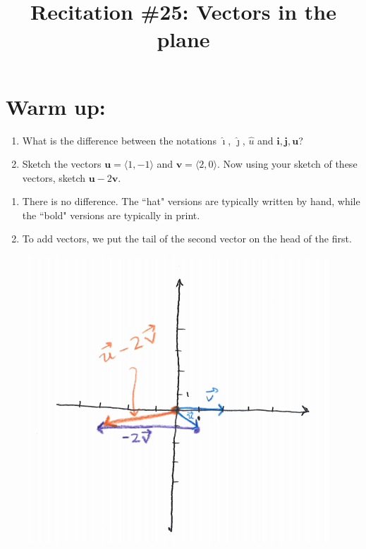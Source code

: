 \documentclass[handout]{ximera}
\title{Recitation \#25: Vectors in the plane}
\begin{document}
\begin{abstract}		\end{abstract}
\maketitle




\section{Warm up:}
\begin{enumerate}
\item What is the difference between the notations $\hat{\imath}$, $\hat{\jmath}$, $\hat{u}$ and $\mathbf{i}, \mathbf{j}, \mathbf{u}$?
\item Sketch the vectors $\mathbf{u}=\langle 1, -1 \rangle$ and $\mathbf{v}=\langle 2, 0 \rangle$. Now using your sketch of these vectors, sketch $\mathbf{u}-2\mathbf{v}$.
\end{enumerate}
	\begin{freeResponse}
	\begin{enumerate}
	\item There is no difference. The ``hat" versions are typically written by hand, while the ``bold" versions are typically in print. 
	\item To add vectors, we put the tail of the second vector on the head of the first. 


\includegraphics[scale=0.5]{Figure12-1-1}



	\end{enumerate}
	\end{freeResponse}
	
\end{document}
